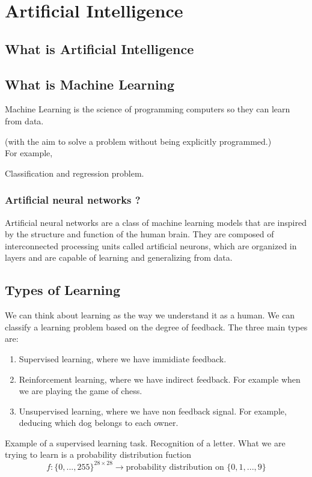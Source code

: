 \documentclass[../main.tex]{subfiles}
\begin{document}
	\chapter{Artificial Intelligence} \label{ch:machine}
	
	\section{What is Artificial Intelligence}
	\section{What is Machine Learning}
	\noindent Machine Learning is the science of programming computers so they can learn from data. 
	
	(with the aim to solve a problem without being explicitly programmed.) \\ 
	
	For example, 
	
	Classification and regression problem. 
	
	\subsection{Artificial neural networks ? }
Artificial neural networks are a class of machine learning models that are inspired by the structure and function of the human brain. They are composed of interconnected processing units called artificial neurons, which are organized in layers and are capable of learning and generalizing from data.
	\section{Types of Learning}
	\noindent
	We can think about learning as the way we understand it as a human. We can classify a learning problem based on the degree of feedback. The three main types are: 
	\begin{enumerate}
		\item Supervised learning, where we have immidiate feedback. %
		\item Reinforcement learning, where we have indirect feedback. %
		 For example when we are playing the game of chess.
		\item Unsupervised learning, where we have non feedback signal. %
		For example, deducing which dog belongs to each owner.  
	\end{enumerate}
\begin{xmpl}
Example of a supervised learning task. Recognition of a letter. What we are trying to learn is a probability distribution fuction 
$$f: \{0,..., 255\}^{28 \times 28} \longrightarrow \text{probability distribution on } \{0,1,...,9\}$$
\end{xmpl}
\end{document}
